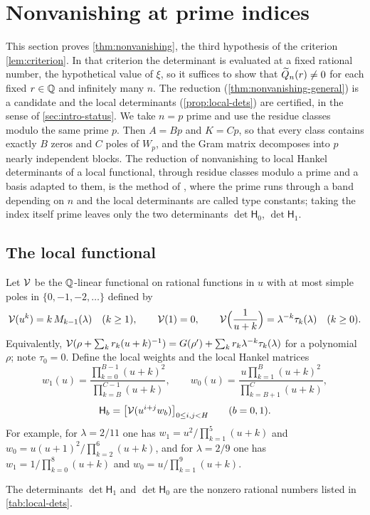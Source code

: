 \section{Nonvanishing at prime indices}\label{sec:nonvanishing}

This section proves \cref{thm:nonvanishing}, the third hypothesis of the criterion \cref{lem:criterion}. In that criterion the determinant is evaluated at a fixed rational number, the hypothetical value of $\xi$, so it suffices to show that $\widetilde{Q}_n(r)\ne0$ for each fixed $r\in\mathbb{Q}$ and infinitely many $n$. The reduction (\cref{thm:nonvanishing-general}) is a candidate and the local determinants (\cref{prop:local-dets}) are certified, in the sense of \cref{sec:intro-status}. We take $n=p$ prime and use the residue classes modulo the same prime $p$. Then $A=Bp$ and $K=Cp$, so that every class contains exactly $B$ zeros and $C$ poles of $W_p$, and the Gram matrix decomposes into $p$ nearly independent blocks. The reduction of nonvanishing to local Hankel determinants of a local functional, through residue classes modulo a prime and a basis adapted to them, is the method of \cite[Section~5]{Litsey2026Li2}, where the prime runs through a band depending on $n$ and the local determinants are called type constants; taking the index itself prime leaves only the two determinants $\det\mathsf H_0$, $\det\mathsf H_1$.

\subsection{The local functional}\label{sec:local-functional}
Let $\mathcal{V}$ be the $\mathbb{Q}$-linear functional on rational functions in $u$ with at most simple poles in $\{0,-1,-2,\dots\}$ defined by
\[
\mathcal{V}(u^k)=k\,M_{k-1}(\lambda)\quad(k\ge1),\qquad \mathcal{V}(1)=0,\qquad \mathcal{V}\Bigl(\frac1{u+k}\Bigr)=\lambda^{-k}\tau_k(\lambda)\quad(k\ge0).
\]
Equivalently, $\mathcal{V}(\rho+\sum_kr_k(u+k)^{-1})=G(\rho')+\sum_kr_k\lambda^{-k}\tau_k(\lambda)$ for a polynomial $\rho$; note $\tau_0=0$. Define the local weights and the local Hankel matrices
\[
w_1(u)=\frac{\prod_{k=0}^{B-1}(u+k)^2}{\prod_{k=B}^{C-1}(u+k)},\qquad w_0(u)=\frac{u\prod_{k=1}^{B}(u+k)^2}{\prod_{k=B+1}^{C}(u+k)},
\]
\[
\mathsf H_b=\bigl[\mathcal{V}(u^{i+j}w_b)\bigr]_{0\le i,j<H}\qquad(b=0,1).
\]
For example, for $\lambda=2/11$ one has $w_1=u^2/\prod_{k=1}^5(u+k)$ and $w_0=u(u+1)^2/\prod_{k=2}^6(u+k)$, and for $\lambda=2/9$ one has $w_1=1/\prod_{k=0}^8(u+k)$ and $w_0=u/\prod_{k=1}^9(u+k)$.

\begin{proposition}\label{prop:local-dets}
The determinants $\det\mathsf H_1$ and $\det\mathsf H_0$ are the nonzero rational numbers listed in \cref{tab:local-dets}.
\end{proposition}

